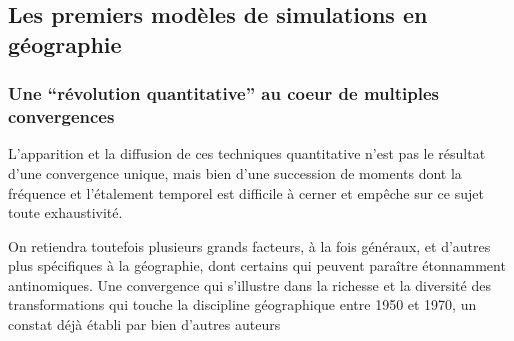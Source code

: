 



\subsection{Les premiers modèles de simulations en géographie}

\subsubsection{Une \enquote{révolution quantitative} au coeur de multiples convergences}

L'apparition et la diffusion de ces techniques quantitative n'est pas le résultat d'une convergence unique, mais bien d'une succession de moments dont la fréquence et l'étalement temporel est difficile à cerner et empêche sur ce sujet toute exhaustivité. 

On retiendra toutefois plusieurs grands facteurs, à la fois généraux, et d'autres plus spécifiques à la géographie, dont certains qui peuvent paraître étonnamment antinomiques. Une convergence qui s'illustre dans la richesse et la diversité des transformations qui touche la discipline géographique entre 1950 et 1970, un constat déjà établi par bien d'autres auteurs \autocite{Varenne2014}

